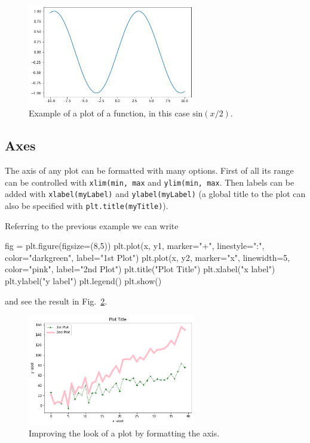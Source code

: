 \begin{figure}[htb]
	\centering
	\includegraphics[width=0.65\textwidth]{figures/sinx_x}
	\caption{Example of a plot of a function, in this case \(\mathrm{sin}(x/2)\).}
	\label{fig:sinx_x}
\end{figure}

\subsection{Axes}\label{axes}

The axis of any plot can be formatted with many options.
First of all its range can be controlled with \texttt{xlim(min, max} and \texttt{ylim(min, max}. Then labels can be added with \texttt{xlabel(myLabel)} and \texttt{ylabel(myLabel)} (a global title to the plot can also be specified with \texttt{plt.title(myTitle)}).

Referring to the previous example we can write

\begin{ipython}
fig = plt.figure(figsize=(8,5))
plt.plot(x, y1, marker="+", linestyle=":", color="darkgreen", label="1st Plot")
plt.plot(x, y2, marker="x", linewidth=5, color="pink", label="2nd Plot")
plt.title("Plot Title")
plt.xlabel("x label")
plt.ylabel("y label")
plt.legend()
plt.show()
\end{ipython}
\noindent
and see the result in Fig.~\ref{fig:axis1}.

\begin{figure}[htb]
	\centering
	\includegraphics[width=0.65\textwidth]{figures/axis1}
	\caption{Improving the look of a plot by formatting the axis.}
	\label{fig:axis1}
\end{figure}

